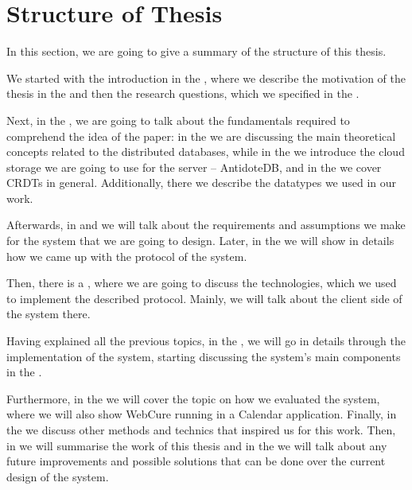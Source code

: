 \section{Structure of Thesis}

In this section, we are going to give a summary of the structure of this thesis. 

We started with the introduction in the , where we describe the motivation of the thesis in the  and then the research questions, which we specified in the . 

Next, in the , we are going to talk about the fundamentals required to comprehend the idea of the paper: in the  we are discussing the main theoretical concepts related to the distributed databases, while in the  we introduce the cloud storage we are going to use for the server -- AntidoteDB, and in the  we cover CRDTs in general. Additionally, there we describe the datatypes we used in our work. 

Afterwards, in  and  we will talk about the requirements and assumptions we make for the system that we are going to design. Later, in the  we will show in details how we came up with the protocol of the system. 

Then, there is a , where we are going to discuss the technologies, which we used to implement the described protocol. Mainly, we will talk about the client side of the system there.

Having explained all the previous topics, in the , we will go in details through the implementation of the system, starting discussing the system's main components in the .

Furthermore, in the  we will cover the topic on how we evaluated the system, where we will also show WebCure running in a Calendar application. Finally, in the  we discuss other methods and technics that inspired us for this work. Then, in  we will summarise the work of this thesis and in the  we will talk about any future improvements and possible solutions that can be done over the current design of the system. 